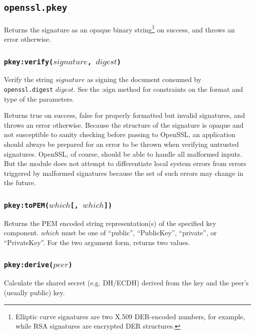 \documentclass[11pt, oneside]{memoir}
\newcommand*{\fn}[1]{\texttt{#1}\xspace}
\newcommand*{\module}[1]{\texttt{#1}\xspace}
\newcounter{toccols}
\newenvironment{Module}[1]{
	\subsection{\texttt{#1}}
	\addtocontents{toc}{
		\protect\begin{multicols}{\value{toccols}}
	}
}{
	\addtocontents{toc}{\protect\end{multicols}}
}
\begin{document}
\begin{Module}{openssl.pkey}
Returns the signature as an opaque binary string\footnote{Elliptic curve signatures are two X.509 DER-encoded numbers, for example, while RSA signatures are encrypted DER structures.} on success, and throws an error otherwise.

\subsubsection[\fn{pkey:verify}]{\fn{pkey:verify($signature$, $digest$)}}

Verify the string $signature$ as signing the document consumed by \module{openssl.digest} $digest$. See the :sign method for constraints on the format and type of the parameters.

Returns true on success, false for properly formatted but invalid signatures, and throws an error otherwise. Because the structure of the signature is opaque and not susceptible to sanity checking before passing to OpenSSL, an application should always be prepared for an error to be thrown when verifying untrusted signatures. OpenSSL, of course, should be able to handle all malformed inputs. But the module does not attempt to differentiate local system errors from errors triggered by malformed signatures because the set of such errors may change in the future.

\subsubsection[\fn{pkey:toPEM}]{\fn{pkey:toPEM($which$[, $which$])}}

Returns the PEM encoded string representation(s) of the specified key component. $which$ must be one of ``public'', ``PublicKey'', ``private'', or ``PrivateKey''. For the two argument form, returns two values.

\subsubsection[\fn{pkey:derive}]{\fn{pkey:derive($peer$)}}

Calculate the shared secret (e.g. DH/ECDH) derived from the key and the peer's
(usually public) key.

\end{Module}
\end{document}
